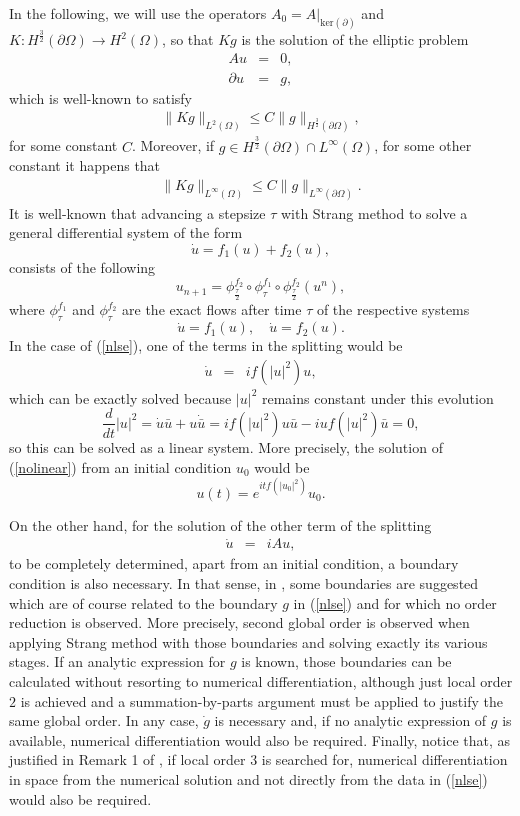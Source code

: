 \documentclass[a4paper,12pt]{article}
\begin{document}
In the following, we will use the operators $A_0=A|_{\mbox{ker}(\partial)}$ and $K: H^{\frac{3}{2}}(\partial \Omega) \to H^2(\Omega)$, so that $K g$ is the solution of the elliptic problem
\begin{eqnarray}
A u &=&0, \nonumber \\
\partial u&=&g, \nonumber
\end{eqnarray}
which is well-known to satisfy \cite{ACP}
\begin{eqnarray}
\|Kg \|_{L^2(\Omega)}\le C \|g\|_{H^{\frac{3}{2}}(\partial \Omega)},
\nonumber
\end{eqnarray}
for some constant $C$.
Moreover, if $g \in H^{\frac{3}{2}}(\partial \Omega)\cap L^{\infty}(\Omega)$, for some other constant it happens that \cite{S}
\begin{eqnarray}
\|Kg \|_{L^\infty(\Omega)}\le C \|g\|_{L^\infty(\partial \Omega)}.
\label{acotK2}
\end{eqnarray}
It is well-known that advancing a stepsize $\tau$ with Strang method to solve a general differential system of the form
$$\dot{u}=f_1(u)+f_2(u),$$
consists of the following
$$u_{n+1}=\phi_{\frac{\tau}{2}}^{f_2}\circ\phi_{\tau}^{f_1}\circ\phi_{\frac{\tau}{2}}^{f_2}(u^n),$$
where $\phi_\tau^{f_1}$ and $\phi_\tau^{f_2}$ are the exact flows after time $\tau$ of the respective systems
$$
\dot{u}=f_1(u), \quad \dot{u}=f_2(u).$$
In the case of
(\ref{nlse}), one of the terms in the splitting would be
\begin{eqnarray}
\dot{u}&=& i f(|u|^2) u, \label{nolinear}
\end{eqnarray}
which can be exactly solved because $|u|^2$ remains constant under this evolution \cite{WH}
$$
\frac{d}{dt} |u|^2= \dot{u} \bar{u}+ u \dot{\bar{u}}=i f(|u|^2) u  \bar{u}-i u f(|u|^2) \bar{u}=0,$$
so this can be solved as a linear system. More precisely, the solution of (\ref{nolinear}) from an initial condition $u_0$ would be
$$
u(t)=e^{i t f(|u_0|^2)}u_0.$$

On the other hand, for the solution of the other term of the splitting
\begin{eqnarray}
\dot{u}&=& i A u, \label{linear}
\end{eqnarray}
to be completely determined, apart from an initial condition, a boundary condition is also necessary. In that sense, in \cite{CR}, some boundaries are suggested which are of course related to the boundary $g$ in (\ref{nlse}) and for which no order reduction is observed. More precisely, second global order is observed when applying Strang method with those boundaries and solving exactly its various stages. If an analytic expression for $g$ is known, those boundaries can be calculated without resorting to numerical differentiation, although just local order $2$ is achieved and a summation-by-parts argument must be applied to justify the same global order. In any case, $\dot{g}$ is necessary and, if no analytic expression of $g$ is available, numerical differentiation would also be required. Finally, notice that, as justified in Remark 1 of \cite{CR}, if local order $3$ is searched for, numerical differentiation in space from the numerical solution and not directly from the data in (\ref{nlse}) would also be required.
\end{document}
